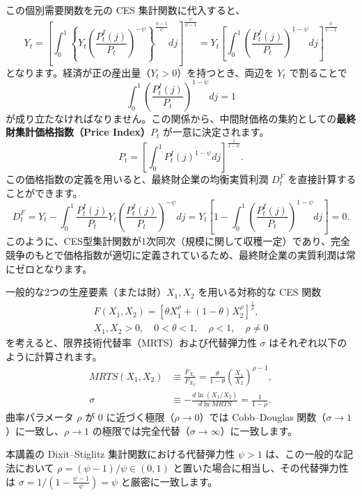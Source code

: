 \documentclass[
  japanese,
  lualatex,
  ja=standard,
  12pt,
  a4paper]{ltjsarticle}
\begin{document}
この個別需要関数を元の CES 集計関数に代入すると、 \[
Y_t = \left[ \int_0^1 \left\{ Y_t \left( \frac{P_t^I(j)}{P_t} \right)^{-\psi} \right\}^{\frac{\psi-1}{\psi}} dj \right]^{\frac{\psi}{\psi-1}} = Y_t \left[ \int_0^1 \left( \frac{P_t^I(j)}{P_t} \right)^{1-\psi} dj \right]^{\frac{\psi}{\psi-1}}
\] となります。経済が正の産出量（\(Y_t > 0\)）を持つとき、両辺を \(Y_t\)
で割ることで \[
\int_0^1 \left( \frac{P_t^I(j)}{P_t} \right)^{1-\psi} dj = 1
\]
が成り立たなければなりません。この関係から、中間財価格の集約としての\textbf{最終財集計価格指数（Price
Index）\(P_t\)} が一意に決定されます。 \[
P_t = \left[ \int_0^1 P_t^I(j)^{1-\psi} dj \right]^{\frac{1}{1-\psi}}.
\] この価格指数の定義を用いると、最終財企業の均衡実質利潤 \(D_t^F\)
を直接計算することができます。 \[
D_t^F = Y_t - \int_0^1 \frac{P_t^I(j)}{P_t} Y_t \left( \frac{P_t^I(j)}{P_t} \right)^{-\psi} dj = Y_t \left[ 1 - \int_0^1 \left( \frac{P_t^I(j)}{P_t} \right)^{1-\psi} dj \right] = 0.
\]
このように、CES型集計関数が1次同次（規模に関して収穫一定）であり、完全競争のもとで価格指数が適切に定義されているため、最終財企業の実質利潤は常にゼロとなります。

\begin{tcolorbox}[enhanced jigsaw, arc=.35mm, bottomrule=.15mm, bottomtitle=1mm, breakable, colback=white, colbacktitle=quarto-callout-note-color!10!white, colframe=quarto-callout-note-color-frame, coltitle=black, left=2mm, leftrule=.75mm, opacityback=0, opacitybacktitle=0.6, rightrule=.15mm, title=\textcolor{quarto-callout-note-color}{\faInfo}\hspace{0.5em}{2投入CESによる代替弾力性の確認}, titlerule=0mm, toprule=.15mm, toptitle=1mm]

一般的な2つの生産要素（または財）\(X_1, X_2\) を用いる対称的な CES 関数
\[
\begin{gathered}
F(X_1, X_2) = \left[ \theta X_1^\rho + (1-\theta) X_2^\rho \right]^{\frac{1}{\rho}},\\[4pt]
X_1, X_2 > 0, \quad 0 < \theta < 1, \quad \rho < 1, \quad \rho \neq 0
\end{gathered}
\] を考えると、限界技術代替率（MRTS）および代替弾力性 \(\sigma\)
はそれぞれ以下のように計算されます。 \[
\begin{aligned}
MRTS(X_1, X_2) &\equiv \frac{F_{X_1}}{F_{X_2}}
 = \frac{\theta}{1-\theta} \left( \frac{X_1}{X_2} \right)^{\rho - 1},\\[6pt]
\sigma &\equiv -\frac{d\ln(X_1/X_2)}{d\ln MRTS}
 = \frac{1}{1-\rho}.
\end{aligned}
\] 曲率パラメータ \(\rho\) が \(0\) に近づく極限（\(\rho \to 0\)）では
Cobb--Douglas 関数（\(\sigma \to 1\)）に一致し、\(\rho \to 1\)
の極限では完全代替（\(\sigma \to \infty\)）に一致します。

本講義の Dixit--Stiglitz 集計関数における代替弾力性 \(\psi > 1\)
は、この一般的な記法において \(\rho = (\psi - 1)/\psi \in (0, 1)\)
と置いた場合に相当し、その代替弾力性は
\(\sigma = 1/(1 - \frac{\psi-1}{\psi}) = \psi\) と厳密に一致します。

\end{tcolorbox}
\end{document}
